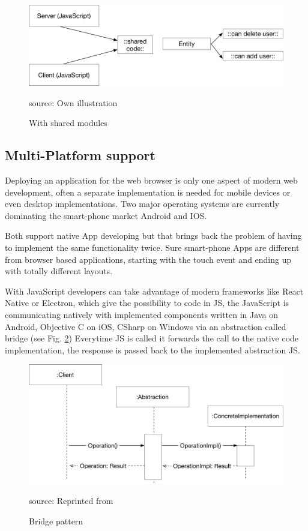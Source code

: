\begin{figure}[H]
	\centering
	\includegraphics[width=0.8\linewidth]{bilder/grundlagen/Entity2.png}
	\caption{With shared modules} source: Own illustration
	\label{fig:DS2}
\end{figure}


\subsection{Multi-Platform support}

Deploying an application for the web browser is only one aspect of modern web development, often a separate implementation is needed for mobile devices or even desktop implementations. Two major operating systems are currently dominating the smart-phone market Android and IOS. 

Both support native App developing but that brings back the problem of having to implement the same functionality twice. Sure smart-phone Apps are different from browser based applications, starting with the touch event and ending up with totally different layouts. 

With JavaScript developers can take advantage of modern frameworks like React Native or Electron, which give the possibility to code in \gls{JS}, the JavaScript is communicating natively with implemented components written in Java on Android, Objective C on iOS, CSharp on Windows via an abstraction called bridge (see Fig. \ref{fig:BP}) Everytime \gls{JS} is called it forwards the call to the native code implementation, the response is passed back to the implemented abstraction \gls{JS}. \cite{Purewal2014LearningWeb}

\begin{figure}[H]
	\centering
	\includegraphics[width=0.8\linewidth]{bilder/grundlagen/BridgePattern.png}
	\caption{Bridge pattern} source: Reprinted from \cite{GOLL}
	\label{fig:BP}
\end{figure}


